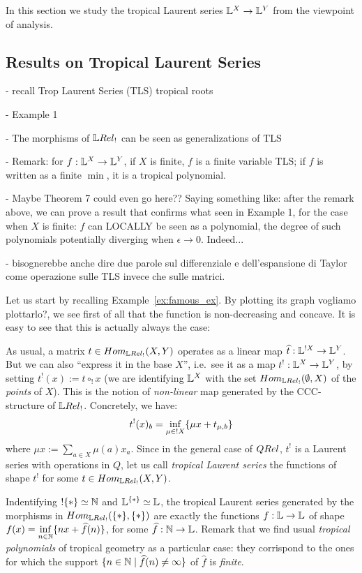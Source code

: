 In this section we study the tropical Laurent series $\mathbb{L}^X\to \mathbb{L} ^Y$ from the viewpoint of analysis.

\subsection{Results on Tropical Laurent Series}
{\color{red}

- recall Trop Laurent Series (TLS) tropical roots

- Example 1

- The morphisms of $\LREL_{!}$ can be seen as generalizations of TLS

- Remark: for $f:\mathbb{L}^{X}\to \mathbb{L}^{Y}$, if $X$ is finite, $f$ is a finite variable TLS; if $f$ is written as a finite $\min$, it is a tropical polynomial. 

- Maybe Theorem 7 could even go here?? Saying something like: after the remark above, we can prove a result that confirms what seen in Example 1, for the case when $X$ is finite: $f$ can LOCALLY be seen as a polynomial, the degree of such polynomials potentially diverging when $\epsilon\to 0$. Indeed...


- bisognerebbe anche dire due parole sul differenziale e dell'espansione di Taylor come operazione sulle TLS invece che sulle matrici. 
}

Let us start by recalling Example~\ref{ex:famous_ex}.
By plotting its graph {\color{red}vogliamo plottarlo?}, we see first of all that the function is non-decreasing and concave.
It is easy to see that this is actually always the case:

\begin{remark}
 As usual, a matrix $t\in\HOM{\LREL_!}{X}{Y}$ operates as a linear map $\widehat t:\mathbb{L}^{!X}\to\mathbb{L}^Y$.
 But we can also ``express it in the base $X$'', i.e.\ see it as a map $t^!:\mathbb{L}^X\to\mathbb{L}^Y$, by setting $t^!(x):=t\circ_! x$ (we are identifying $\mathbb{L}^X$ with the set $\HOM{\LREL_!}{\emptyset}{X}$ of the \emph{points} of $X$).
 This is the notion of \emph{non-linear} map generated by the CCC-structure of $\LREL_!$.
 Concretely, we have:
 \[t^!(x)_b=\inf\limits_{\mu\in !X} \{\mu x+ t_{\mu,b}\}\] where $\mu x:=\sum\limits_{a\in X} \mu(a)x_a$.
 Since in the general case of $\QREL$, $t^!$ is a Laurent series with operations in $Q$, let us call \emph{tropical Laurent series} the functions of shape $t^!$ for some $t\in\HOM{\LREL_!}{X}{Y}$.
\end{remark}

\begin{remark}
 Indentifying $!\{*\}\simeq \mathbb{N}$ and $\mathbb{L}^{\{*\}}\simeq\mathbb{L}$, the tropical Laurent series generated by the morphisms in $\HOM{\LREL_!}{\set{*}}{\set{*}}$ are exactly the functions $f:\mathbb{L}\to\mathbb{L}$ of shape $f(x)=\inf\limits_{n\in\mathbb{N}}\{nx+\widehat f(n)\}$, for some $\widehat f:\mathbb{N}\to\mathbb{L}$.
Remark that we find usual \emph{tropical polynomials} of tropical geometry as a particular case: they corrispond to the ones for which the support $\{n\in\mathbb{N}\mid\widehat f(n)\neq\infty\}$ of $\widehat f$ is \emph{finite}.
\end{remark}

